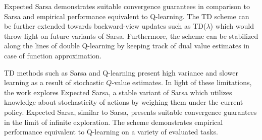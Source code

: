\documentclass[11pt,letterpaper]{article}
\begin{document}
Expected Sarsa demonstrates suitable convergence guarantees in comparison to Sarsa and empirical performance equivalent to Q-learning. The TD scheme can be further extended towards backward-view updates such as TD($\lambda$) which would throw light on future variants of Sarsa. Furthermore, the scheme can be stabilized along the lines of double Q-learning by keeping track of dual value estimates in case of function approximation. 

TD methods such as Sarsa and Q-learning present high variance and slower learning as a result of stochastic $Q$-value estimates. In light of these limitations, the work explores Expected Sarsa, a stable variant of Sarsa which utilizes knowledge about stochasticity of actions by weighing them under the current policy. Expected Sarsa, similar to Sarsa, presents suitable convergence guarantees in the limit of infinite exploration. The scheme demonstrates empirical performance equivalent to Q-learning on a variety of evaluated tasks. 
\end{document}
